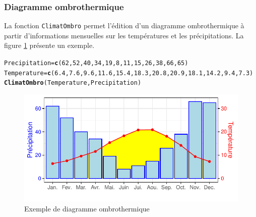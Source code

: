 \documentclass{article}\usepackage[]{graphicx}\usepackage[]{color}
\makeatletter
\def\maxwidth{ %
  \ifdim\Gin@nat@width>\linewidth
    \linewidth
  \else
    \Gin@nat@width
  \fi
}
\newcommand{\hlnum}[1]{\textcolor[rgb]{0.686,0.059,0.569}{#1}}%
\newcommand{\hlstd}[1]{\textcolor[rgb]{0.345,0.345,0.345}{#1}}%
\newcommand{\hlkwb}[1]{\textcolor[rgb]{0.69,0.353,0.396}{#1}}%
\newcommand{\hlkwd}[1]{\textcolor[rgb]{0.737,0.353,0.396}{\textbf{#1}}}%
\newenvironment{kframe}{%
 \def\at@end@of@kframe{}%
 \ifinner\ifhmode%
  \def\at@end@of@kframe{\end{minipage}}%
  \begin{minipage}{\columnwidth}%
 \fi\fi%
 \def\FrameCommand##1{\hskip\@totalleftmargin \hskip-\fboxsep
 \colorbox{shadecolor}{##1}\hskip-\fboxsep
     \hskip-\linewidth \hskip-\@totalleftmargin \hskip\columnwidth}%
 \MakeFramed {\advance\hsize-\width
   \@totalleftmargin\z@ \linewidth\hsize
   \@setminipage}}%
 {\par\unskip\endMakeFramed%
 \at@end@of@kframe}
\newenvironment{knitrout}{}{} %
\makeatother
\begin{document}
\subsubsection{Diagramme ombrothermique}
La fonction \texttt{ClimatOmbro} permet l'édition d'un diagramme ombrothermique à partir d'informations mensuelles sur les températures et les précipitations. La figure \ref{fig:ClimatOmbro} présente un exemple.
\begin{knitrout}\small
{}\color{fgcolor}\begin{kframe}
\begin{alltt}
\hlstd{Precipitation} \hlkwb{=} \hlkwd{c}\hlstd{(}\hlnum{62}\hlstd{,}\hlnum{52}\hlstd{,}\hlnum{40}\hlstd{,}\hlnum{34}\hlstd{,}\hlnum{19}\hlstd{,}\hlnum{8}\hlstd{,}\hlnum{11}\hlstd{,}\hlnum{15}\hlstd{,}\hlnum{26}\hlstd{,}\hlnum{38}\hlstd{,}\hlnum{66}\hlstd{,}\hlnum{65}\hlstd{)}
\hlstd{Temperature} \hlkwb{=} \hlkwd{c}\hlstd{(}\hlnum{6.4}\hlstd{,}\hlnum{7.6}\hlstd{,}\hlnum{9.6}\hlstd{,}\hlnum{11.6}\hlstd{,}\hlnum{15.4}\hlstd{,}\hlnum{18.3}\hlstd{,}\hlnum{20.8}\hlstd{,}\hlnum{20.9}\hlstd{,}\hlnum{18.1}\hlstd{,}\hlnum{14.2}\hlstd{,}\hlnum{9.4}\hlstd{,}\hlnum{7.3}\hlstd{)}
\hlkwd{ClimatOmbro}\hlstd{(Temperature, Precipitation)}
\end{alltt}
\end{kframe}\begin{figure}[H]

{\centering \includegraphics[width=\maxwidth]{Figures/ClimatOmbro-1} 

}

\caption[Exemple de diagramme ombrothermique]{Exemple de diagramme ombrothermique}\label{fig:ClimatOmbro}
\end{figure}


\end{knitrout}


\end{document}
